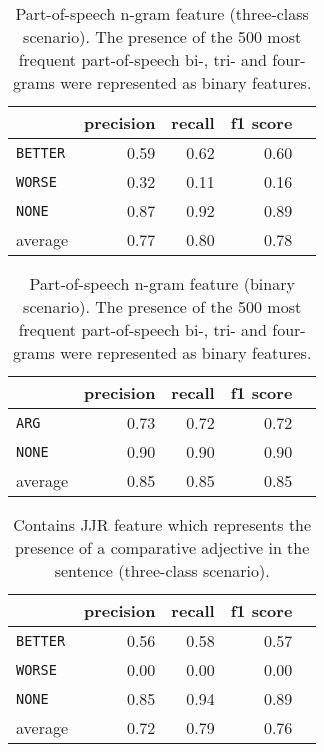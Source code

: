 

\begin{table}[htbp] 
	\centering 
		\caption{Part-of-speech n-gram feature (three-class scenario). The presence of the 500 most frequent part-of-speech bi-, tri- and four-grams were represented as binary features.} 
	\begin{tabular}{@{}lrrrr@{}}
		\toprule
		                & precision & recall & f1 score \\ \midrule 
		\texttt{BETTER} & 0.59      & 0.62   & 0.60     \\ 
		\texttt{WORSE}  & 0.32      & 0.11   & 0.16     \\ 
		\texttt{NONE}   & 0.87      & 0.92   & 0.89     \\ 
		average         & 0.77      & 0.80   & 0.78     \\ 			\bottomrule
	\end{tabular}
\end{table}

\begin{table}[h] 
	\centering 
			\caption{Part-of-speech n-gram feature (binary scenario). The presence of the 500 most frequent part-of-speech bi-, tri- and four-grams were represented as binary features.} 
	\begin{tabular}{@{}lrrrr@{}}
		\toprule
		                & precision & recall & f1 score \\ \midrule 
		\texttt{ARG}    & 0.73      & 0.72   & 0.72     \\ 
		\texttt{NONE}   & 0.90      & 0.90   & 0.90     \\ 
		average         & 0.85      & 0.85   & 0.85     \\ 			\bottomrule
	\end{tabular}
\end{table}



\begin{table}[htbp] 
	\centering 
	\caption{Contains JJR feature which represents the presence of a comparative adjective in the sentence (three-class scenario).} 
	\begin{tabular}{@{}lrrrr@{}}
		\toprule
		                & precision & recall & f1 score \\ \midrule 
		\texttt{BETTER} & 0.56      & 0.58   & 0.57     \\ 
		\texttt{WORSE}  & 0.00      & 0.00   & 0.00     \\ 
		\texttt{NONE}   & 0.85      & 0.94   & 0.89     \\ 
		average         & 0.72      & 0.79   & 0.76     \\ 			\bottomrule
	\end{tabular}
\end{table}

